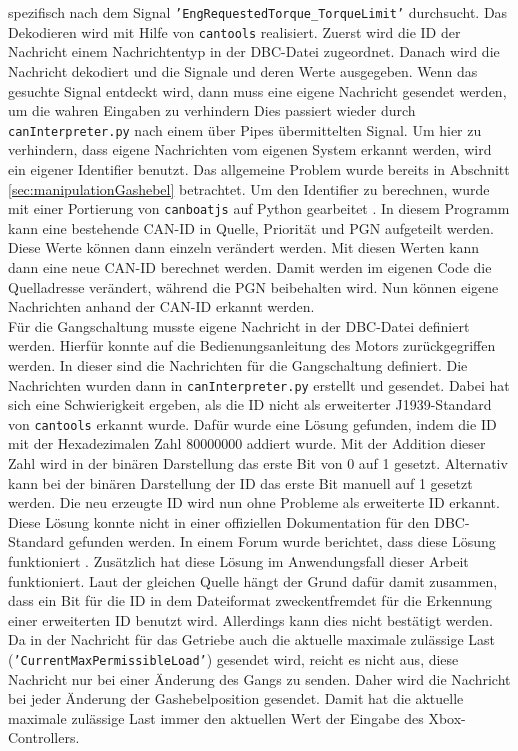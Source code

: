 spezifisch nach
dem Signal \texttt{'EngRequestedTorque\_TorqueLimit'} durchsucht. 
Das Dekodieren wird mit Hilfe von \texttt{cantools} realisiert. Zuerst wird die ID der Nachricht einem Nachrichtentyp in der DBC-Datei
zugeordnet. Danach wird die Nachricht dekodiert und die Signale und deren Werte ausgegeben.
Wenn das gesuchte Signal entdeckt wird, dann muss eine eigene Nachricht
gesendet werden, um die wahren Eingaben zu verhindern
Dies passiert wieder durch \texttt{canInterpreter.py} nach 
einem über Pipes übermittelten Signal. Um hier zu verhindern, dass eigene Nachrichten vom eigenen System erkannt werden,
wird ein eigener Identifier benutzt. Das allgemeine Problem wurde bereits in Abschnitt \ref{sec:manipulationGashebel}
betrachtet.
Um den Identifier zu berechnen, wurde mit einer Portierung von \texttt{canboatjs} auf Python gearbeitet 
\cite{canboatjs}. 
In diesem Programm kann eine bestehende CAN-ID in Quelle, Priorität und PGN aufgeteilt werden. Diese Werte können dann
einzeln verändert werden. Mit diesen Werten kann dann eine neue CAN-ID berechnet werden. 
Damit werden im eigenen Code die Quelladresse verändert, während die PGN beibehalten wird.
Nun können eigene Nachrichten 
anhand der CAN-ID erkannt werden.\\
Für die Gangschaltung musste eigene Nachricht in der DBC-Datei definiert werden. Hierfür konnte auf die Bedienungsanleitung
des Motors zurückgegriffen werden. In dieser sind die Nachrichten für die Gangschaltung definiert.
Die Nachrichten wurden dann in \texttt{canInterpreter.py} erstellt und gesendet.
Dabei hat sich eine Schwierigkeit ergeben, als die ID nicht als erweiterter J1939-Standard von \texttt{cantools} erkannt wurde. 
Dafür wurde eine Lösung gefunden, indem die ID mit der Hexadezimalen Zahl 80000000 addiert wurde. Mit der Addition dieser Zahl
wird in der binären Darstellung das erste Bit von 0 auf 1 gesetzt. Alternativ kann bei der binären Darstellung der ID das erste Bit
manuell auf 1 gesetzt werden. Die neu erzeugte ID
wird nun ohne Probleme als erweiterte ID erkannt. Diese Lösung konnte nicht in einer offiziellen Dokumentation für den
DBC-Standard gefunden werden. In einem Forum wurde berichtet, dass diese Lösung funktioniert \cite{cantoolsIssue}. 
Zusätzlich hat diese Lösung im Anwendungsfall dieser Arbeit funktioniert. 
Laut der gleichen Quelle hängt der Grund dafür damit zusammen, dass ein Bit für die ID in dem Dateiformat zweckentfremdet für
die Erkennung einer erweiterten ID benutzt wird. Allerdings kann dies nicht bestätigt werden. \\
Da in der Nachricht für das Getriebe auch die aktuelle maximale zulässige Last (\texttt{'CurrentMaxPermissibleLoad'}) gesendet wird, 
reicht es nicht aus, diese
Nachricht nur bei einer Änderung des Gangs zu senden. Daher wird die Nachricht bei jeder Änderung der Gashebelposition
gesendet. Damit hat die aktuelle maximale zulässige Last immer den aktuellen Wert der Eingabe des Xbox-Controllers.